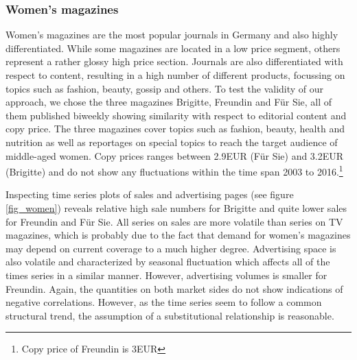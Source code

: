\documentclass[12pt,a4paper,notitlepage]{article}
\begin{document}
\subsubsection{Women's magazines}

Women's magazines are the most popular journals in Germany and also highly differentiated. While some magazines are located in a low price segment, others represent a rather glossy high price section. Journals are also differentiated with respect to content, resulting in a high number of different products, focussing on topics such as fashion, beauty, gossip and others. To test the validity of our approach, we chose the three magazines Brigitte, Freundin and Für Sie, all of them published biweekly showing similarity with respect to editorial content and copy price. The three magazines cover topics such as fashion, beauty, health and nutrition as well as reportages on special topics to reach the target audience of middle-aged women. Copy prices ranges between 2.9EUR (Für Sie) and 3.2EUR (Brigitte) and do not show any fluctuations within the time span 2003 to 2016.\footnote{Copy price of Freundin is 3EUR} 

Inspecting time series plots of sales and advertising pages (see figure \ref{fig_women}) reveals relative high sale numbers for Brigitte and quite lower sales for Freundin and Für Sie. All series on sales are more volatile than series on TV magazines, which is probably due to the fact that demand for women's magazines may depend on current coverage to a much higher degree. Advertising space is also volatile and characterized by seasonal fluctuation which affects all of the times series in a similar manner. However, advertising volumes is smaller for Freundin. Again, the quantities on both market sides do not show indications of negative correlations. However, as the time series seem to follow a common structural trend, the assumption of a substitutional relationship is reasonable. 
\end{document}
